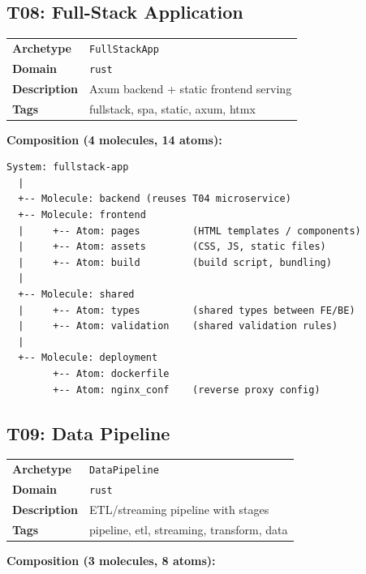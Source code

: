 \documentclass[11pt,a4paper,twoside]{article}
\theoremstyle{definition}
\theoremstyle{plain}
\theoremstyle{remark}
\begin{document}
\subsection{T08: Full-Stack Application}\label{sec:t08}

\begin{tabularx}{\textwidth}{l X}
\toprule
\textbf{Archetype} & \texttt{FullStackApp} \\
\textbf{Domain} & \texttt{rust} \\
\textbf{Description} & Axum backend + static frontend serving \\
\textbf{Tags} & fullstack, spa, static, axum, htmx \\
\bottomrule
\end{tabularx}

\medskip\noindent\textbf{Composition (4 molecules, 14 atoms):}

\begin{lstlisting}
System: fullstack-app
  |
  +-- Molecule: backend (reuses T04 microservice)
  +-- Molecule: frontend
  |     +-- Atom: pages         (HTML templates / components)
  |     +-- Atom: assets        (CSS, JS, static files)
  |     +-- Atom: build         (build script, bundling)
  |
  +-- Molecule: shared
  |     +-- Atom: types         (shared types between FE/BE)
  |     +-- Atom: validation    (shared validation rules)
  |
  +-- Molecule: deployment
        +-- Atom: dockerfile
        +-- Atom: nginx_conf    (reverse proxy config)
\end{lstlisting}

\subsection{T09: Data Pipeline}\label{sec:t09}

\begin{tabularx}{\textwidth}{l X}
\toprule
\textbf{Archetype} & \texttt{DataPipeline} \\
\textbf{Domain} & \texttt{rust} \\
\textbf{Description} & ETL/streaming pipeline with stages \\
\textbf{Tags} & pipeline, etl, streaming, transform, data \\
\bottomrule
\end{tabularx}

\medskip\noindent\textbf{Composition (3 molecules, 8 atoms):}
\end{document}
